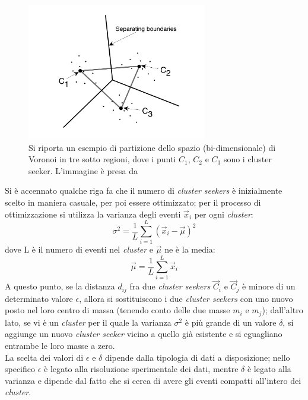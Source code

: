 \begin{figure}[h!]
	\centering
	\includegraphics[width=0.70\textwidth]{figs/Voronoi.png}
	\caption{Si riporta un esempio di partizione dello spazio (bi-dimensionale) di Voronoi in tre sotto regioni, dove i punti $C_1$, $C_2$ e $C_3$ sono i cluster seeker. L'immagine è presa da \cite{IntroML}}
	\label{Voronoi}
\end{figure}

Si è accennato qualche riga fa che il numero di \textit{cluster seekers} è inizialmente scelto in maniera casuale, per poi essere ottimizzato; per il processo di ottimizzazione si utilizza la varianza degli eventi $\vec{x}_i$ per ogni \textit{cluster}:
\begin{equation}
\sigma^2 = \frac{1}{L}\sum_{i=1}^{L} (\vec{x}_i - \vec{\mu})^2
\end{equation}
dove L è il numero di eventi nel \textit{cluster} e $\vec{\mu}$ ne è la media:
\begin{equation}
\vec{\mu} = \frac{1}{L}\sum_{i=1}^{L} \vec{x}_i
\end{equation}
A questo punto, se la distanza $d_{ij}$ fra due \textit{cluster seekers} $\vec{C}_i$ e $\vec{C}_j$ è minore di un determinato valore $\epsilon$, allora si sostituiscono i due \textit{cluster seekers} con uno nuovo posto nel loro centro di massa (tenendo conto delle due masse $m_i$ e $m_j$); dall'altro lato, se vi è un \textit{cluster} per il quale la varianza $\sigma^2$ è più grande di un valore $\delta$, si aggiunge un nuovo \textit{cluster seeker} vicino a quello già esistente e si eguagliano entrambe le loro masse a zero.\\
La scelta dei valori di $\epsilon$ e $\delta$ dipende dalla tipologia di dati a disposizione; nello specifico $\epsilon$ è legato alla risoluzione sperimentale dei dati, mentre $\delta$ è legato alla varianza e dipende dal fatto che si cerca di avere gli eventi compatti all'intero dei \textit{cluster}.

